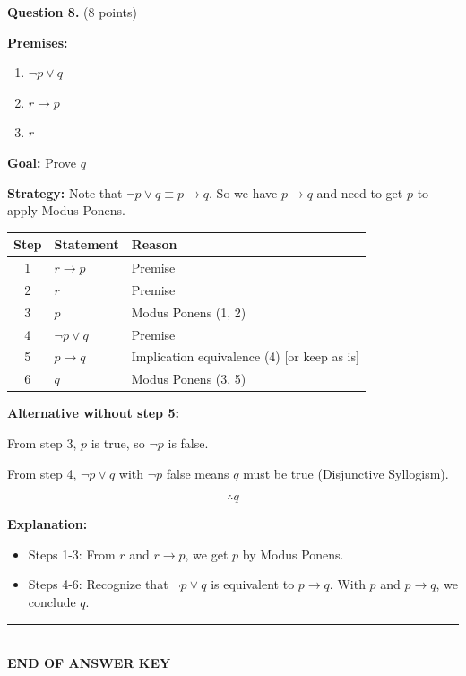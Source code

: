 \documentclass[11pt,a4paper]{article}
\begin{document}
\vspace{15pt}

\textbf{Question 8.} (8 points)

\begin{solnbox}
\textbf{Premises:}
\begin{enumerate}[noitemsep]
    \item $\neg p \lor q$
    \item $r \to p$
    \item $r$
\end{enumerate}

\textbf{Goal:} Prove $q$

\textbf{Strategy:} Note that $\neg p \lor q \equiv p \to q$. So we have $p \to q$ and need to get $p$ to apply Modus Ponens.

\begin{center}
\begin{tabular}{c|l|l}
\toprule
\textbf{Step} & \textbf{Statement} & \textbf{Reason} \\
\midrule
1 & $r \to p$ & Premise \\
2 & $r$ & Premise \\
3 & $p$ & Modus Ponens (1, 2) \\
4 & $\neg p \lor q$ & Premise \\
5 & $p \to q$ & Implication equivalence (4) [or keep as is] \\
6 & $q$ & Modus Ponens (3, 5) \\
\bottomrule
\end{tabular}
\end{center}

\textbf{Alternative without step 5:}

From step 3, $p$ is true, so $\neg p$ is false.

From step 4, $\neg p \lor q$ with $\neg p$ false means $q$ must be true (Disjunctive Syllogism).

$$\boxed{\therefore q}$$

\textbf{Explanation:}
\begin{itemize}[noitemsep]
    \item Steps 1-3: From $r$ and $r \to p$, we get $p$ by Modus Ponens.
    \item Steps 4-6: Recognize that $\neg p \lor q$ is equivalent to $p \to q$. With $p$ and $p \to q$, we conclude $q$.
\end{itemize}
\end{solnbox}

\vspace{20pt}

\begin{center}
\rule{0.5\textwidth}{0.5pt}\\[5pt]
\textbf{END OF ANSWER KEY}
\end{center}
\end{document}
